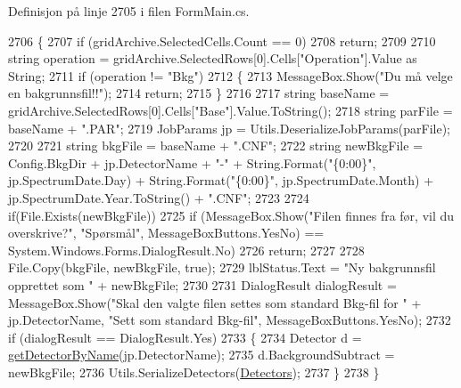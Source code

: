 Definisjon på linje 2705 i filen Form\+Main.\+cs.


\begin{DoxyCode}
2706         \{
2707             \textcolor{keywordflow}{if} (gridArchive.SelectedCells.Count == 0)
2708                 \textcolor{keywordflow}{return};
2709             
2710             \textcolor{keywordtype}{string} operation = gridArchive.SelectedRows[0].Cells[\textcolor{stringliteral}{"Operation"}].Value as String;
2711             \textcolor{keywordflow}{if} (operation != \textcolor{stringliteral}{"Bkg"})
2712             \{
2713                 MessageBox.Show(\textcolor{stringliteral}{"Du må velge en bakgrunnsfil!!"});
2714                 \textcolor{keywordflow}{return};
2715             \}
2716             
2717             \textcolor{keywordtype}{string} baseName = gridArchive.SelectedRows[0].Cells[\textcolor{stringliteral}{"Base"}].Value.ToString();
2718             \textcolor{keywordtype}{string} parFile = baseName + \textcolor{stringliteral}{".PAR"};
2719             JobParams jp = Utils.DeserializeJobParams(parFile);
2720 
2721             \textcolor{keywordtype}{string} bkgFile = baseName + \textcolor{stringliteral}{".CNF"};
2722             \textcolor{keywordtype}{string} newBkgFile = Config.BkgDir + jp.DetectorName + \textcolor{stringliteral}{"-"} + String.Format(\textcolor{stringliteral}{"\{0:00\}"}, 
      jp.SpectrumDate.Day) + String.Format(\textcolor{stringliteral}{"\{0:00\}"}, jp.SpectrumDate.Month) + jp.SpectrumDate.Year.ToString() + \textcolor{stringliteral}{".CNF"};
2723 
2724             \textcolor{keywordflow}{if}(File.Exists(newBkgFile))
2725                 \textcolor{keywordflow}{if} (MessageBox.Show(\textcolor{stringliteral}{"Filen finnes fra før, vil du overskrive?"}, \textcolor{stringliteral}{"Spørsmål"}, 
      MessageBoxButtons.YesNo) == System.Windows.Forms.DialogResult.No)
2726                     \textcolor{keywordflow}{return};
2727 
2728             File.Copy(bkgFile, newBkgFile, \textcolor{keyword}{true});
2729             lblStatus.Text = \textcolor{stringliteral}{"Ny bakgrunnsfil opprettet som "} + newBkgFile;
2730 
2731             DialogResult dialogResult = MessageBox.Show(\textcolor{stringliteral}{"Skal den valgte filen settes som standard Bkg-fil
       for "} + jp.DetectorName, \textcolor{stringliteral}{"Sett som standard Bkg-fil"}, MessageBoxButtons.YesNo);
2732             \textcolor{keywordflow}{if} (dialogResult == DialogResult.Yes)
2733             \{   
2734                 Detector d = \hyperlink{class_scintilab_1_1_form_main_aff4482e0919480013a53fe56cfb374ba}{getDetectorByName}(jp.DetectorName);
2735                 d.BackgroundSubtract = newBkgFile;
2736                 Utils.SerializeDetectors(\hyperlink{class_scintilab_1_1_form_main_a88f16134102d9e4c5630adf5ff97f090}{Detectors});
2737             \}  
2738         \}
\end{DoxyCode}
